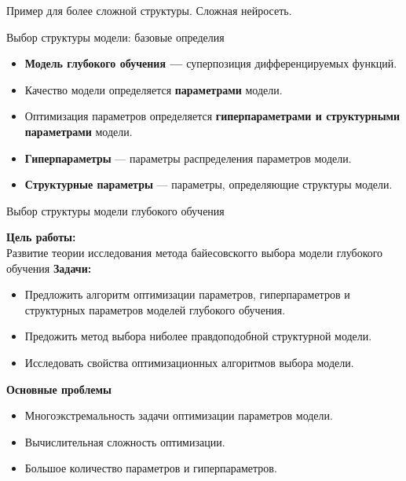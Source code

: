 \documentclass[usenames,dvipsnames,11pt,pdf,utf8,russian,aspectratio=169]{beamer}
\begin{document}
\begin{frame}{}
Пример для более сложной структуры.
Сложная нейросеть.
\end{frame}


\begin{frame}{Выбор  структуры модели: базовые определия}
\begin{itemize}
\item \textbf{Модель глубокого обучения --- } суперпозиция дифференцируемых функций.
\item Качество модели определяется \textbf{параметрами} модели.
\item Оптимизация параметров определяется \textbf{гиперпараметрами и структурными параметрами} модели.
\item \textbf{Гиперпараметры} --- параметры распределения параметров модели.
\item \textbf{Структурные параметры} --- параметры, определяющие структуры модели.
\end{itemize} 
\end{frame}


\begin{frame}{Выбор  структуры модели глубокого обучения}

\textbf{Цель работы:}\\
Развитие теории исследования метода байесовскогго выбора модели глубокого обучения
\textbf{Задачи:}
\begin{itemize}
\item Предложить алгоритм оптимизации параметров, гиперпараметров и структурных параметров моделей глубокого обучения.
\item Предожить метод выбора ниболее правдоподобной структурной модели.
\item Исследовать свойства оптимизационных алгоритмов выбора модели.
\end{itemize}
\textbf{Основные проблемы}
\begin{itemize}
\item Многоэкстремальность задачи оптимизации параметров модели.
\item Вычислительная сложность оптимизации.
\item Большое количество параметров и гиперпараметров.
\end{itemize}

\end{frame}
\end{document}
